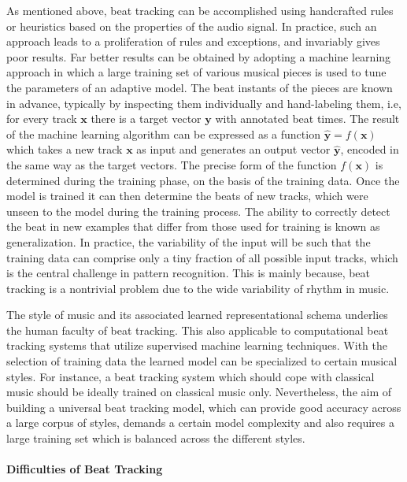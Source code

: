 \documentclass{scrartcl}
\begin{document}
As mentioned above, beat tracking can be accomplished using handcrafted rules or heuristics based on the properties of the audio signal. In practice, such an approach leads to a proliferation of rules and exceptions, and invariably gives poor results. Far better results can be obtained by adopting a machine learning approach in which a large training set of various musical pieces is used to tune the parameters of an adaptive model. The beat instants of the pieces are known in advance, typically by inspecting them individually and hand-labeling them, i.e, for every track $\mathbf x$ there is a target vector $\mathbf y$ with annotated beat times. The result of the machine learning algorithm can be expressed as a function $\hat{\mathbf y} = f (\mathbf x)$ which takes a new track $\mathbf x$ as input and generates an output vector $\hat{\mathbf y}$, encoded in the same way as the target vectors. The precise form of the function $f (\mathbf x)$ is determined during the training phase, on the basis of the training data. Once the model is trained it can then determine the beats of new tracks, which were unseen to the model during the training process. The ability to correctly detect the beat in new examples that differ from those used for training is known as generalization. In practice, the variability of the input will be such that the training data can comprise only a tiny fraction of all possible input tracks, which is the central challenge in pattern recognition. This is mainly because, beat tracking is a nontrivial problem due to the wide variability of rhythm in music. 

The style of music and its associated learned representational schema underlies the human faculty of beat tracking. This also applicable to computational beat tracking systems that utilize supervised machine learning techniques. With the selection of  training data the learned model can be specialized to certain musical styles. For instance, a beat tracking system which should cope with classical music should be ideally trained on classical music only. Nevertheless, the aim of building a universal beat tracking model, which can provide good accuracy across a large corpus of styles, demands a certain model complexity and also requires a large training set which is balanced across the different styles. 


\paragraph{Difficulties of Beat Tracking}
\label{sec:difficulties}
\end{document}
